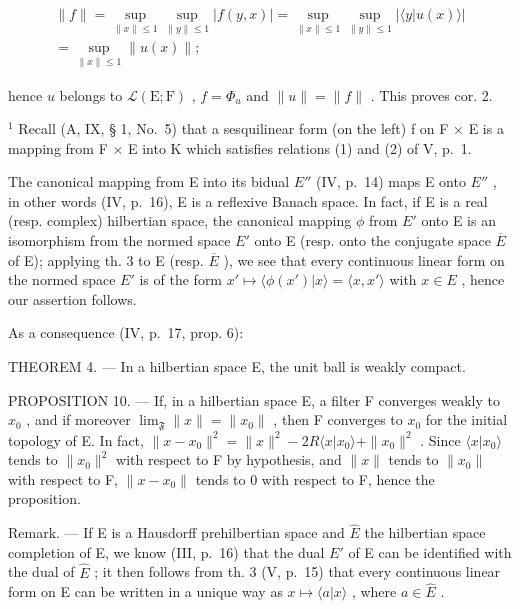\[
\begin{array}{l} \| f \| = \sup _ {\| x \| \leqslant 1} \sup _ {\| y \| \leqslant 1} | f (y, x) | = \sup _ {\| x \| \leqslant 1} \sup _ {\| y \| \leqslant 1} | \langle y | u (x) \rangle | \\ = \sup _ {\| x \| \leqslant 1} \| u (x) \|; \end{array}
\]

hence \(u\) belongs to \(\mathcal{L}(\mathrm{E};\mathrm{F})\) , \(f = \Phi_u\) and \(\| u\| = \| f\|\) . This proves cor. 2.

\(^{1}\) Recall (A, IX, § 1, No.~5) that a sesquilinear form (on the left) f on F × E is a mapping from F × E into K which satisfies relations (1) and (2) of V, p.~1.

The canonical mapping from E into its bidual \(E''\) (IV, p.~14) maps E onto \(E''\) , in other words (IV, p.~16), E is a reflexive Banach space. In fact, if E is a real (resp. complex) hilbertian space, the canonical mapping \(\phi\) from \(E'\) onto E is an isomorphism from the normed space \(E'\) onto E (resp. onto the conjugate space \(\overline{E}\) of E); applying th. 3 to E (resp. \(\overline{E}\) ), we see that every continuous linear form on the normed space \(E'\) is of the form \(x' \mapsto \langle \phi(x') | x \rangle = \langle x, x' \rangle\) with \(x \in E\) , hence our assertion follows.

As a consequence (IV, p.~17, prop. 6):

THEOREM 4. --- In a hilbertian space E, the unit ball is weakly compact.

PROPOSITION 10. --- If, in a hilbertian space E, a filter F converges weakly to \(x_{0}\) , and if moreover \(\lim_{\mathfrak{F}} \|x\| = \|x_{0}\|\) , then F converges to \(x_{0}\) for the initial topology of E. In fact, \(\|x - x_{0}\|^{2} = \|x\|^{2} - 2R \langle x|x_{0} \rangle + \|x_{0}\|^{2}\) . Since \(\langle x|x_{0}\rangle\) tends to \(\|x_{0}\|^{2}\) with respect to F by hypothesis, and \(\|x\|\) tends to \(\|x_{0}\|\) with respect to F, \(\|x - x_{0}\|\) tends to 0 with respect to F, hence the proposition.

Remark. --- If E is a Hausdorff prehilbertian space and \(\hat{E}\) the hilbertian space completion of E, we know (III, p.~16) that the dual \(E'\) of E can be identified with the dual of \(\hat{E}\) ; it then follows from th. 3 (V, p.~15) that every continuous linear form on E can be written in a unique way as \(x \mapsto \langle a|x\rangle\) , where \(a \in \hat{E}\) .

